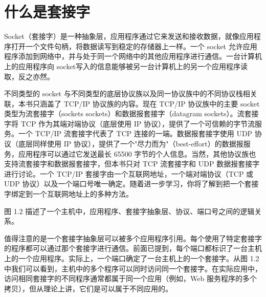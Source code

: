 	\section{什么是套接字}

		Socket（套接字）是一种抽象层，应用程序通过它来发送和接收数据，就像应用程序打开一个文件句柄，将数据读写到稳定的存储器上一样。一个 socket 允许应用程序添加到网络中，并与处于同一个网络中的其他应用程序进行通信。一台计算机上的应用程序向 socket写入的信息能够被另一台计算机上的另一个应用程序读取，反之亦然。

		不同类型的 socket 与不同类型的底层协议族以及同一协议族中的不同协议栈相关联，本书只涵盖了 TCP/IP 协议族的内容。现在 TCP/IP 协议族中的主要 socket 类型为流套接字（sockets sockets）和数据报套接字（datagram sockets）。流套接字将 TCP 作为其端对端协议（底层使用 IP 协议），提供了一个可信赖的字节流服务。一个 TCP/IP 流套接字代表了 TCP 连接的一端。数据报套接字使用 UDP 协议（底层同样使用 IP 协议），提供了一个"尽力而为"（best-effort）的数据报服务，应用程序可以通过它发送最长 65500 字节的个人信息。当然，其他协议族也支持流套接字和数据报套接字，但本书只对 TCP 流套接字和 UDP 数据报套接字进行讨论。一个 TCP/IP 套接字由一个互联网地址，一个端对端协议（TCP 或 UDP 协议）以及一个端口号唯一确定。随着进一步学习，你将了解到把一个套接字绑定到一个互联网地址上的多种方法。

		图 1.2 描述了一个主机中，应用程序、套接字抽象层、协议、端口号之间的逻辑关系。

		值得注意的是一个套接字抽象层可以被多个应用程序引用。每个使用了特定套接字的程序都可以通过那个套接字进行通信。前面已提到，每个端口都标识了一台主机上的一个应用程序。实际上，一个端口确定了一台主机上的一个套接字。从图 1.2 中我们可以看到，主机中的多个程序可以同时访问同一个套接字。在实际应用中，访问相同套接字的不同程序通常都属于同一个应用（例如，Web 服务程序的多个拷贝），但从理论上讲，它们是可以属于不同应用的。


